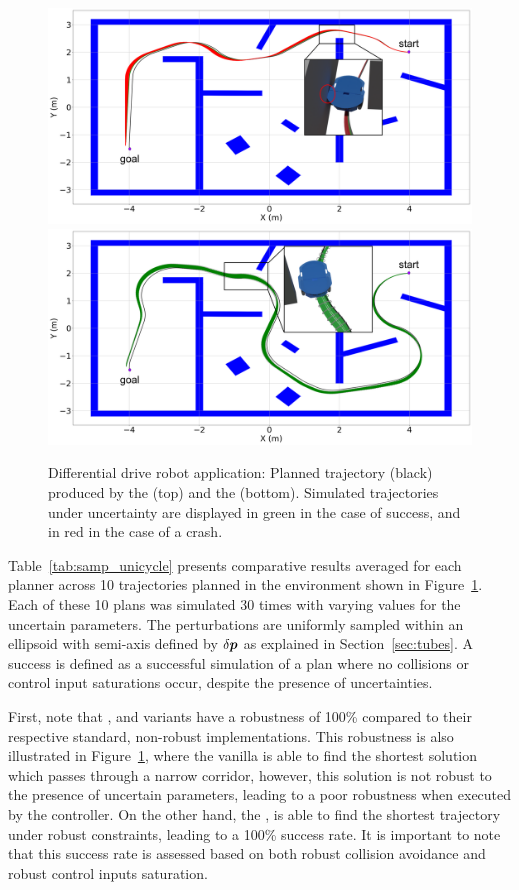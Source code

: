 \begin{figure} [h!]
    \centering
    \includegraphics[width=0.9\linewidth]{figures/samp/non_robust_unic.png}
    \includegraphics[width=0.9\linewidth]{figures/samp/robust_unic.png}
    \caption{Differential drive robot application: Planned trajectory (black) produced by the  (top) and the  (bottom). 
    Simulated trajectories under uncertainty are displayed in green in the case of success, and in red in the case of a crash.}%
    \label{fig:robust_unic}%
\end{figure}

Table~\ref{tab:samp_unicycle} presents comparative results averaged for each planner across 10 trajectories planned in the environment shown in Figure~\ref{fig:robust_unic}. 
Each of these 10 plans was simulated 30 times with varying values for the uncertain parameters.
The perturbations are uniformly sampled within an ellipsoid with semi-axis defined by $\delta \boldsymbol{p}$ as explained in Section~\ref{sec:tubes}.
A success is defined as a successful simulation of a plan where no collisions or control input saturations occur, despite the presence of uncertainties.

First, note that , and  variants have a robustness of 100\% compared to their respective standard, non-robust implementations.
This robustness is also illustrated in Figure~\ref{fig:robust_unic}, where the vanilla  is able to find the shortest solution which passes through a narrow corridor, however, this solution is not robust to the presence of uncertain parameters, leading to a poor robustness when executed by the controller.
On the other hand, the , is able to find the shortest trajectory under robust constraints, leading to a 100\% success rate.
It is important to note that this success rate is assessed based on both robust collision avoidance and robust control inputs saturation.

